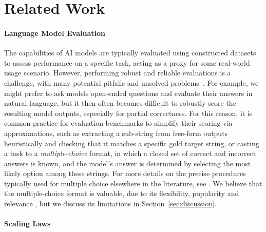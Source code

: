 \appendix
\onecolumn




\section{Related Work}
\label{app:sec:related_work}

\paragraph{Language Model Evaluation}

The capabilities of AI models are typically evaluated using constructed datasets to assess performance on a specific task, acting as a proxy for some real-world usage scenario. However, performing robust and reliable evaluations is a challenge, with many potential pitfalls and unsolved problems~\citep{biderman2024lessons}. For example, we might prefer to ask models open-ended questions and evaluate their answers in natural language, but it then often becomes difficult to robustly score the resulting model outputs, especially for partial correctness. For this reason, it is common practice for evaluation benchmarks to simplify their scoring via approximations, such as extracting a sub-string from free-form outputs heuristically \citep{joshi2017triviaqa, kwiatkowski2019naturalquestions, hendrycks2021math} and checking that it matches a specific gold target string, or casting a task to a \textit{multiple-choice} format, in which a closed set of correct and incorrect answers is known, and the model's answer is determined by selecting the most likely option among these strings. For more details on the precise procedures typically used for multiple choice elsewhere in the literature, see \citet{biderman2024lessons}. We believe that the multiple-choice format is valuable, due to its flexibility, popularity and relevance \citep{brown2020language, open-llm-leaderboard, biderman2024lessons}, but we discuss its limitations in Section~\ref{sec:discussion}.

\paragraph{Scaling Laws}

